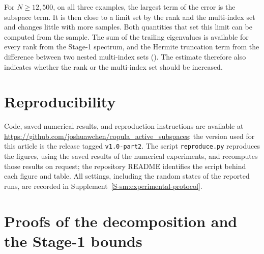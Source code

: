 \documentclass[review,hidelinks,onefignum,onetabnum]{siamart251216}
\begin{document}
For $N \ge 12{,}500$, on all three examples, the largest term of the error is the subspace term. It is then close to a limit set by the rank and the multi-index set and changes little with more samples. Both quantities that set this limit can be computed from the sample. The sum of the trailing eigenvalues is available for every rank from the Stage-1 spectrum, and the Hermite truncation term from the difference between two nested multi-index sets (). The estimate therefore also indicates whether the rank or the multi-index set should be increased.

\section*{Reproducibility}
\label{sec:reproducibility}

Code, saved numerical results, and reproduction instructions are available at \url{https://github.com/joshuawchen/copula_active_subspaces}; the version used for this article is the release tagged \texttt{v1.0-part2}. The script \texttt{reproduce.py} reproduces the figures, using the saved results of the numerical experiments, and recomputes those results on request; the repository README identifies the script behind each figure and table. All settings, including the random states of the reported runs, are recorded in Supplement~\ref{S-sm:experimental-protocol}.


\appendix
{}

\section{Proofs of the decomposition and the Stage-1 bounds}
\label{app:thm-trunc}
\end{document}
